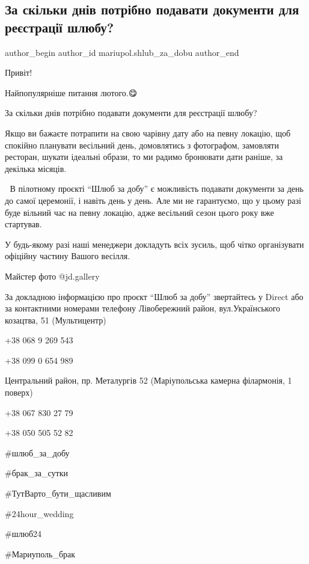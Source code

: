  
 
 
 
 

\subsection{За скільки днів потрібно подавати документи для реєстрації шлюбу?}
\label{sec:18_02_2022.fb.mariupol.shlub_za_dobu.1.za_skilky_dniv_podavaty_dokumenty_reestracia}

\ifcmt
 author_begin
   author_id mariupol.shlub_za_dobu
 author_end
\fi

Привіт!👋

Найпопулярніше питання лютого.😋

За скільки днів потрібно подавати документи для реєстрації шлюбу?

Якщо ви бажаєте потрапити на свою чарівну дату або на певну локацію, щоб
спокійно планувати весільний день, домовлятись з фотографом, замовляти
ресторан, шукати ідеальні образи, то ми радимо бронювати дати раніше, за
декілька місяців.

🌸 В пілотному проєкті \enquote{Шлюб за добу} є можливість подавати документи за день
до самої церемонії, і навіть день у день. Але ми не гарантуємо, що у цьому разі
буде вільний час на певну локацію, адже весільний сезон цього року вже
стартував.

У будь-якому разі наші менеджери докладуть всіх зусиль, щоб чітко організувати
офіційну частину Вашого весілля.

Майстер фото @jd.gallery

За докладною інформацією про проєкт \enquote{Шлюб за добу} звертайтесь у Direct або за
контактними номерами телефону Лівобережний район, вул.Українського козацтва, 51
(Мультицентр)

+38 068 9 269 543\par
+38 099 0 654 989\par
Центральний район, пр. Металургів 52 (Маріупольська камерна філармонія, 1 поверх)\par
+38 067 830 27 79\par
+38 050 505 52 82\par

\#шлюб\_за\_добу 

\#брак\_за\_сутки

\#ТутВарто\_бути\_щасливим 

\#24hour\_wedding  

\#шлюб24 

\#Мариуполь\_брак
